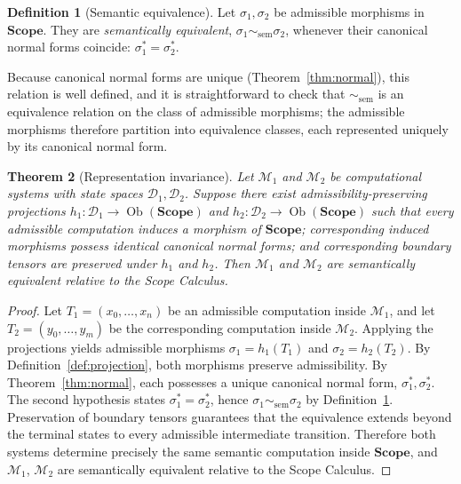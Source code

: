 \documentclass[11pt,twoside,openright]{book}
\numberwithin{equation}{chapter}
\theoremstyle{definition}
\newtheorem{definition}{Definition}[chapter]
\theoremstyle{plain}
\newtheorem{theorem}[definition]{Theorem}
\theoremstyle{remark}
\theoremstyle{definition}
\newcommand{\CatScope}{\mathbf{Scope}}
\newcommand{\ScopeMorph}{\sigma}
\newcommand{\Domain}{\mathcal{D}}
\DeclareMathOperator{\Obj}{Ob}
\begin{document}
\begin{definition}[Semantic equivalence]
\label{def:semantic_equivalence}
Let $\ScopeMorph_1,\ScopeMorph_2$ be admissible morphisms in $\CatScope$.
They are \emph{semantically equivalent}, $\ScopeMorph_1\sim_{\mathrm{sem}}\ScopeMorph_2$,
whenever their canonical normal forms coincide: $\ScopeMorph_1^*=\ScopeMorph_2^*$.
\end{definition}

Because canonical normal forms are unique (Theorem~\ref{thm:normal}),
this relation is well defined, and it is straightforward to check that
$\sim_{\mathrm{sem}}$ is an equivalence relation on the class of
admissible morphisms; the admissible morphisms therefore partition into
equivalence classes, each represented uniquely by its canonical normal
form.

\begin{theorem}[Representation invariance]
\label{thm:representation}
Let $\mathcal M_1$ and $\mathcal M_2$ be computational systems with state
spaces $\Domain_1,\Domain_2$. Suppose there exist admissibility-preserving
projections $h_1:\Domain_1\to\Obj(\CatScope)$ and
$h_2:\Domain_2\to\Obj(\CatScope)$ such that every admissible computation
induces a morphism of $\CatScope$; corresponding induced morphisms possess
identical canonical normal forms; and corresponding boundary tensors are
preserved under $h_1$ and $h_2$. Then $\mathcal M_1$ and $\mathcal M_2$ are
semantically equivalent relative to the Scope Calculus.
\end{theorem}

\begin{proof}
Let $T_1=(x_0,\ldots,x_n)$ be an admissible computation inside
$\mathcal M_1$, and let $T_2=(y_0,\ldots,y_m)$ be the corresponding
computation inside $\mathcal M_2$. Applying the projections yields
admissible morphisms $\ScopeMorph_1=h_1(T_1)$ and $\ScopeMorph_2=h_2(T_2)$. By
Definition~\ref{def:projection}, both morphisms preserve admissibility.
By Theorem~\ref{thm:normal}, each possesses a unique canonical normal
form, $\ScopeMorph_1^*,\ScopeMorph_2^*$. The second hypothesis states
$\ScopeMorph_1^*=\ScopeMorph_2^*$, hence
$\ScopeMorph_1\sim_{\mathrm{sem}}\ScopeMorph_2$ by
Definition~\ref{def:semantic_equivalence}. Preservation of boundary
tensors guarantees that the equivalence extends beyond the terminal
states to every admissible intermediate transition. Therefore both
systems determine precisely the same semantic computation inside
$\CatScope$, and $\mathcal M_1$, $\mathcal M_2$ are semantically
equivalent relative to the Scope Calculus.
\end{proof}
\end{document}
